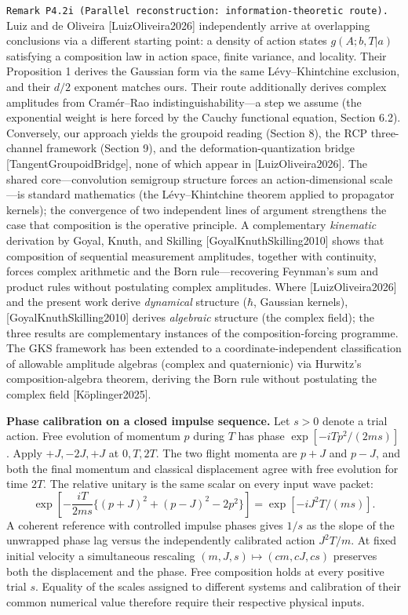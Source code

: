 \documentclass[
]{article}
\begin{document}
\texttt{Remark\ P4.2i\ (Parallel\ reconstruction:\ information-theoretic\ route).}
Luiz and de Oliveira {[}LuizOliveira2026{]} independently arrive at
overlapping conclusions via a different starting point: a density of
action states \(g(A;b,T|a)\) satisfying a composition law in action
space, finite variance, and locality. Their Proposition 1 derives the
Gaussian form via the same Lévy--Khintchine exclusion, and their \(d/2\)
exponent matches ours. Their route additionally derives complex
amplitudes from Cramér--Rao indistinguishability---a step we assume (the
exponential weight is here forced by the Cauchy functional equation,
Section 6.2). Conversely, our approach yields the groupoid reading
(Section 8), the RCP three-channel framework (Section 9), and the
deformation-quantization bridge {[}TangentGroupoidBridge{]}, none of
which appear in {[}LuizOliveira2026{]}. The shared core---convolution
semigroup structure forces an action-dimensional scale---is standard
mathematics (the Lévy--Khintchine theorem applied to propagator
kernels); the convergence of two independent lines of argument
strengthens the case that composition is the operative principle. A
complementary \emph{kinematic} derivation by Goyal, Knuth, and Skilling
{[}GoyalKnuthSkilling2010{]} shows that composition of sequential
measurement amplitudes, together with continuity, forces complex
arithmetic and the Born rule---recovering Feynman's sum and product
rules without postulating complex amplitudes. Where
{[}LuizOliveira2026{]} and the present work derive \emph{dynamical}
structure (\(\hbar\), Gaussian kernels), {[}GoyalKnuthSkilling2010{]}
derives \emph{algebraic} structure (the complex field); the three
results are complementary instances of the composition-forcing
programme. The GKS framework has been extended to a
coordinate-independent classification of allowable amplitude algebras
(complex and quaternionic) via Hurwitz's composition-algebra theorem,
deriving the Born rule without postulating the complex field
{[}Köplinger2025{]}.

\textbf{Phase calibration on a closed impulse sequence.} Let \(s>0\)
denote a trial action. Free evolution of momentum \(p\) during \(T\) has
phase \(\exp[-iTp^2/(2ms)]\). Apply \(+J,-2J,+J\) at \(0,T,2T\). The two
flight momenta are \(p+J\) and \(p-J\), and both the final momentum and
classical displacement agree with free evolution for time \(2T\). The
relative unitary is the same scalar on every input wave packet: \[
\exp\!\left[-\frac{iT}{2ms}\{(p+J)^2+(p-J)^2-2p^2\}\right]
  =\exp[-iJ^2T/(ms)] .
\] A coherent reference with controlled impulse phases gives \(1/s\) as
the slope of the unwrapped phase lag versus the independently calibrated
action \(J^2T/m\). At fixed initial velocity a simultaneous rescaling
\((m,J,s)\mapsto(c m,c J,c s)\) preserves both the displacement and the
phase. Free composition holds at every positive trial \(s\). Equality of
the scales assigned to different systems and calibration of their common
numerical value therefore require their respective physical inputs.
\end{document}
